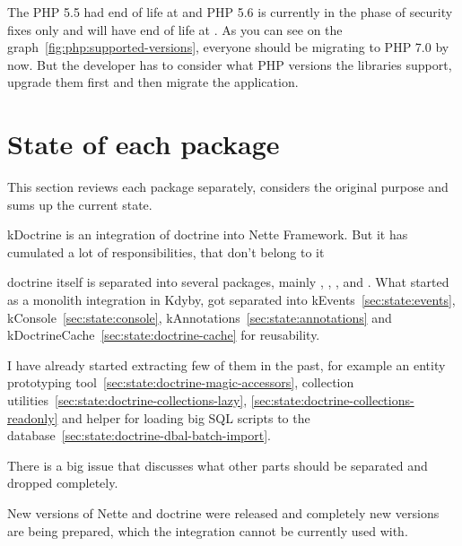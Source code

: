 The PHP 5.5 had end of life at  and PHP 5.6 is currently in the phase of security fixes only and will have end of life at . As you can see on the graph~\ref{fig:php:supported-versions}, everyone should be migrating to PHP 7.0 by now. But the developer has to consider what PHP versions the libraries support, upgrade them first and then migrate the application.

\section{State of each package}

This section reviews each package separately, considers the original purpose and sums up the current state.

 \label{sec:state:doctrine}

\gls{kDoctrine} is an integration of \gls{doctrine} into Nette Framework. But it has cumulated a lot of responsibilities, that don't belong to it

\gls{doctrine} itself is separated into several packages, mainly , , ,  and . What started as a monolith integration in Kdyby, got separated into \gls{kEvents}~\ref{sec:state:events}, \gls{kConsole}~\ref{sec:state:console}, \gls{kAnnotations}~\ref{sec:state:annotations} and \gls{kDoctrineCache}~\ref{sec:state:doctrine-cache} for reusability.

I have already started extracting few of them in the past, for example an entity prototyping tool~\ref{sec:state:doctrine-magic-accessors}, collection utilities~\ref{sec:state:doctrine-collections-lazy}, \ref{sec:state:doctrine-collections-readonly} and helper for loading big SQL scripts to the database~\ref{sec:state:doctrine-dbal-batch-import}.

There is a big issue  that discusses what other parts should be separated and dropped completely.

New versions of Nette and \gls{doctrine} were released and completely new versions are being prepared, which the integration cannot be currently used with.

